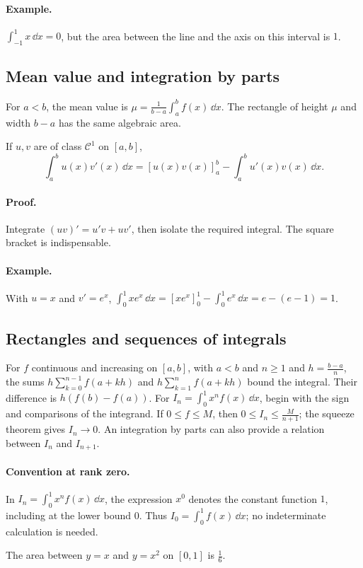 \paragraph{Example.} $\int_{-1}^{1}x\,\dd x=0$, but the area between the line and the axis on this interval is $1$.
\subsection{Mean value and integration by parts}
For $a<b$, the mean value is $\mu=\frac1{b-a}\int_a^b f(x)\,\dd x$. The rectangle of height $\mu$ and width $b-a$ has the same algebraic area.
\begin{keypoint}
If $u,v$ are of class $\mathcal C^1$ on $[a,b]$,
\[\int_a^b u(x)v'(x)\,\dd x=[u(x)v(x)]_a^b-\int_a^b u'(x)v(x)\,\dd x.\]
\end{keypoint}
\paragraph{Proof.} Integrate $(uv)'=u'v+uv'$, then isolate the required integral. The square bracket is indispensable.
\paragraph{Example.} With $u=x$ and $v'=e^x$, $\int_0^1xe^x\,\dd x=[xe^x]_0^1-\int_0^1e^x\,\dd x=e-(e-1)=1$.
\subsection{Rectangles and sequences of integrals}
For $f$ continuous and increasing on $[a,b]$, with $a<b$ and $n\ge1$ and $h=\frac{b-a}{n}$, the sums $h\sum_{k=0}^{n-1}f(a+kh)$ and $h\sum_{k=1}^{n}f(a+kh)$ bound the integral. Their difference is $h(f(b)-f(a))$.
For $I_n=\int_0^1x^nf(x)\,\dd x$, begin with the sign and comparisons of the integrand. If $0\le f\le M$, then $0\le I_n\le \frac{M}{n+1}$; the squeeze theorem gives $I_n\to0$. An integration by parts can also provide a relation between $I_n$ and $I_{n+1}$.
\paragraph{Convention at rank zero.} In $I_n=\int_0^1x^nf(x)\,\dd x$, the expression $x^0$ denotes the constant function $1$, including at the lower bound $0$. Thus $I_0=\int_0^1f(x)\,\dd x$; no indeterminate calculation is needed.


\begin{center}\par\small The area between $y=x$ and $y=x^2$ on $[0,1]$ is $\frac{1}{6}$.\end{center}

